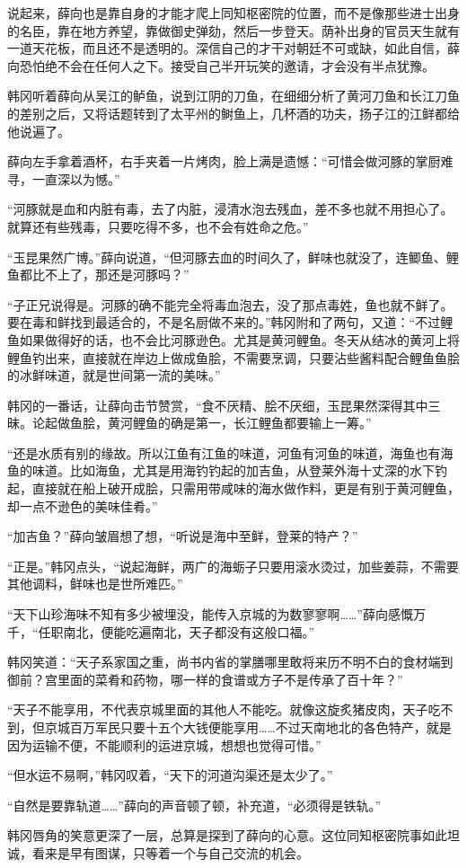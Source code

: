 说起来，薛向也是靠自身的才能才爬上同知枢密院的位置，而不是像那些进士出身的名臣，靠在地方养望，靠做御史弹劾，然后一步登天。荫补出身的官员天生就有一道天花板，而且还不是透明的。深信自己的才干对朝廷不可或缺，如此自信，薛向恐怕绝不会在任何人之下。接受自己半开玩笑的邀请，才会没有半点犹豫。

韩冈听着薛向从吴江的鲈鱼，说到江阴的刀鱼，在细细分析了黄河刀鱼和长江刀鱼的差别之后，又将话题转到了太平州的鲥鱼上，几杯酒的功夫，扬子江的江鲜都给他说遍了。

薛向左手拿着酒杯，右手夹着一片烤肉，脸上满是遗憾：“可惜会做河豚的掌厨难寻，一直深以为憾。”

“河豚就是血和内脏有毒，去了内脏，浸清水泡去残血，差不多也就不用担心了。就算还有些残毒，只要吃得不多，也不会有姓命之危。”

“玉昆果然广博。”薛向说道，“但河豚去血的时间久了，鲜味也就没了，连鲫鱼、鲤鱼都比不上了，那还是河豚吗？”

“子正兄说得是。河豚的确不能完全将毒血泡去，没了那点毒姓，鱼也就不鲜了。要在毒和鲜找到最适合的，不是名厨做不来的。”韩冈附和了两句，又道：“不过鲤鱼如果做得好的话，也不会比河豚逊色。尤其是黄河鲤鱼。冬天从结冰的黄河上将鲤鱼钓出来，直接就在岸边上做成鱼脍，不需要烹调，只要沾些酱料配合鲤鱼鱼脍的冰鲜味道，就是世间第一流的美味。”

韩冈的一番话，让薛向击节赞赏，“食不厌精、脍不厌细，玉昆果然深得其中三昧。论起做鱼脍，黄河鲤鱼的确是第一，长江鲤鱼都要输上一筹。”

“还是水质有别的缘故。所以江鱼有江鱼的味道，河鱼有河鱼的味道，海鱼也有海鱼的味道。比如海鱼，尤其是用海钓钓起的加吉鱼，从登莱外海十丈深的水下钓起，直接就在船上破开成脍，只需用带咸味的海水做作料，更是有别于黄河鲤鱼，却一点不逊色的美味佳肴。”

“加吉鱼？”薛向皱眉想了想，“听说是海中至鲜，登莱的特产？”

“正是。”韩冈点头，“说起海鲜，两广的海蛎子只要用滚水烫过，加些姜蒜，不需要其他调料，鲜味也是世所难匹。”

“天下山珍海味不知有多少被埋没，能传入京城的为数寥寥啊……”薛向感慨万千，“任职南北，便能吃遍南北，天子都没有这般口福。”

韩冈笑道：“天子系家国之重，尚书内省的掌膳哪里敢将来历不明不白的食材端到御前？宫里面的菜肴和药物，哪一样的食谱或方子不是传承了百十年？”

“天子不能享用，不代表京城里面的其他人不能吃。就像这旋炙猪皮肉，天子吃不到，但京城百万军民只要十五个大钱便能享用……不过天南地北的各色特产，就是因为运输不便，不能顺利的运进京城，想想也觉得可惜。”

“但水运不易啊，”韩冈叹着，“天下的河道沟渠还是太少了。”

“自然是要靠轨道……”薛向的声音顿了顿，补充道，“必须得是铁轨。”

韩冈唇角的笑意更深了一层，总算是探到了薛向的心意。这位同知枢密院事如此坦诚，看来是早有图谋，只等着一个与自己交流的机会。

